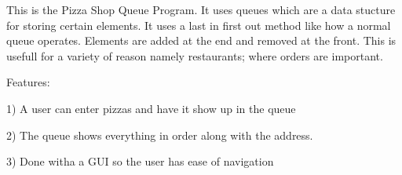 This is the Pizza Shop Queue Program. It uses queues which are a data stucture for storing certain elements. It uses a last in first out method like how a normal queue operates. Elements are added at the end and removed at the front. This is usefull for a variety of reason namely restaurants; where orders are important.

Features\+:

1) A user can enter pizzas and have it show up in the queue

2) The queue shows everything in order along with the address.

3) Done witha a G\+U\+I so the user has ease of navigation 